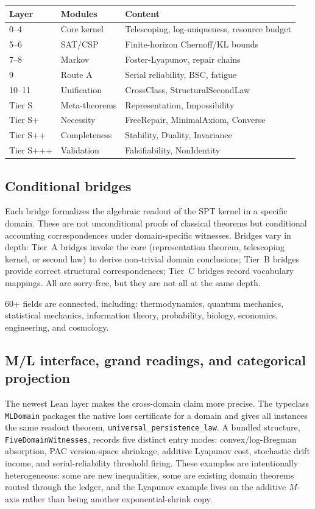 \documentclass[11pt,a4paper]{article}
\begin{document}
\begin{center}
\begin{tabular}{lll}
\toprule
Layer & Modules & Content \\
\midrule
0--4 & Core kernel & Telescoping, log-uniqueness, resource budget \\
5--6 & SAT/CSP & Finite-horizon Chernoff/KL bounds \\
7--8 & Markov & Foster-Lyapunov, repair chains \\
9 & Route A & Serial reliability, BSC, fatigue \\
10--11 & Unification & CrossClass, StructuralSecondLaw \\
Tier S & Meta-theorems & Representation, Impossibility \\
Tier S+ & Necessity & FreeRepair, MinimalAxiom, Converse \\
Tier S++ & Completeness & Stability, Duality, Invariance \\
Tier S+++ & Validation & Falsifiability, NonIdentity \\
\bottomrule
\end{tabular}
\end{center}

\subsection{Conditional bridges}

Each bridge formalizes the algebraic readout of the SPT kernel in a specific domain. These are not unconditional proofs of classical theorems but conditional accounting correspondences under domain-specific witnesses. Bridges vary in depth: Tier~A bridges invoke the core (representation theorem, telescoping kernel, or second law) to derive non-trivial domain conclusions; Tier~B bridges provide correct structural correspondences; Tier~C bridges record vocabulary mappings. All are sorry-free, but they are not all at the same depth.

60+ fields are connected, including: thermodynamics, quantum mechanics, statistical mechanics, information theory, probability, biology, economics, engineering, and cosmology.

\subsection{M/L interface, grand readings, and categorical projection}

The newest Lean layer makes the cross-domain claim more precise. The typeclass \texttt{MLDomain} packages the native loss certificate for a domain and gives all instances the same readout theorem, \texttt{universal\_persistence\_law}. A bundled structure, \texttt{FiveDomainWitnesses}, records five distinct entry modes: convex/log-Bregman absorption, PAC version-space shrinkage, additive Lyapunov cost, stochastic drift income, and serial-reliability threshold firing. These examples are intentionally heterogeneous: some are new inequalities, some are existing domain theorems routed through the ledger, and the Lyapunov example lives on the additive $M$-axis rather than being another exponential-shrink copy.
\end{document}
